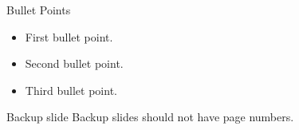 \documentclass[noamssymb,noamsmath,aspectratio=169,9pt]{beamer}
\begin{document}
\begin{frame}{Bullet Points}

\begin{itemize}
  \item First bullet point.
    \pause
  \item Second bullet point.
    \pause
  \item Third bullet point.
\end{itemize}
\end{frame}

\begin{frame}{Backup slide}
  Backup slides should not have page numbers.
\end{frame}
\end{document}
